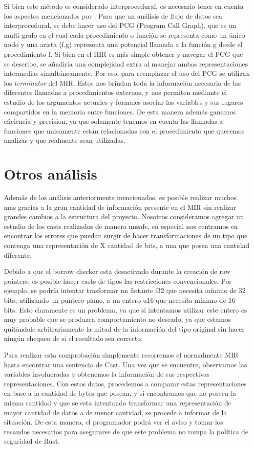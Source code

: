 Si bien este método es considerado interprocedural, es necesario tener en cuenta los aspectos mencionados por \cite{interprocedural}. Para que un análisis de flujo de datos sea interprocedural, se debe hacer uso del PCG (Program Call Graph), que es un multi-grafo en el cual cada procedimiento o función se representa como un único nodo y una arista (f,g) representa una potencial llamada a la función g desde el procedimiento f.
Si bien en el HIR es más simple obtener y navegar el PCG que se describe, se añadiría una complejidad extra al manejar ambas representaciones intermedias simultáneamente. Por eso, para reemplazar el uso del PCG se utilizan los \textit{terminator} del MIR. Estos nos brindan toda la información necesaria de las diferentes llamadas a procedimientos externos, y nos permiten mediante el estudio de los argumentos actuales y formales asociar las variables y sus lugares compartidos en la memoria entre funciones. De esta manera además ganamos eficiencia y precision, ya que solamente tenemos en cuenta las llamadas a funciones que unicamente están relacionadas con el procedimiento que queremos analizar y que realmente sean utilizadas.

\section{Otros análisis}

Además de los análisis anteriormente mencionados, es posible realizar muchos mas gracias a la gran cantidad de información presente en el MIR sin realizar grandes cambios a la estructura del proyecto. Nosotros consideramos agregar un estudio de los casts realizados de manera unsafe, en especial nos centramos en encontrar los errores que puedan surgir de hacer transformaciones de un tipo que contenga una representación de X cantidad de bits, a una que posea una cantidad diferente.

Debido a que el borrow checker esta desactivado durante la creación de raw pointers, es posible hacer casts de tipos las restricciones convencionales. Por ejemplo, se podría intentar trasformar un flotante f32 que necesita mínimo de 32 bits, utilizando un puntero plano, a un entero u16 que necesita mínimo de 16 bits. Esto claramente es un problema, ya que si intentamos utilizar este entero es muy probable que se produzca comportamiento no deseado, ya que estamos quitándole arbitrariamente la mitad de la información del tipo original sin hacer ningún chequeo de si el resultado sea correcto.

Para realizar esta comprobación simplemente recorremos el normalmente MIR hasta encontrar una sentencia de Cast. Una vez que se encuentre, observamos las variables involucradas y obtenemos la información de sus respectivas representaciones. Con estos datos, procedemos a comparar estas representaciones en base a la cantidad de bytes que posean, y si encontramos que no poseen la misma cantidad y que se esta intentando transformar una representación de mayor cantidad de datos a de menor cantidad, se procede a informar de la situación. De esta manera, el programador podrá ver el aviso y tomar los recaudos necesarios para asegurarse de que este problema no rompa la política de seguridad de Rust.